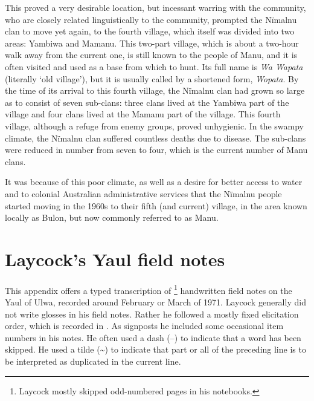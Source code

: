   This proved a very desirable location, but incessant warring with the  community, who are closely related linguistically to the  community, prompted the Nïmalnu clan to move yet again, to the fourth village, which itself was divided into two areas: Yambiwa and Mamanu. This two-part village, which is about a two-hour walk away from the current one, is still known to the people of Manu, and it is often visited and used as a base from which to hunt. Its full name is \textit{Wa Wapata} (literally ‘old village’), but it is usually called by a shortened form, \textit{Wopata}. By the time of its arrival to this fourth village, the Nïmalnu clan had grown so large as to consist of seven sub-clans: three clans lived at the \linebreak Yambiwa part of the village and four clans lived at the Mamanu part of the village. This fourth village, although a refuge from enemy groups, proved unhygienic. In the swampy climate, the Nïmalnu clan suffered countless deaths due to disease. The sub-clans were reduced in number from seven to four, which is the current number of Manu clans.

  It was because of this poor climate, as well as a desire for better access to water and to colonial Australian administrative services that the Nïmalnu people started moving in the 1960s to their fifth (and current) village, in the area known locally as Bulon, but now commonly referred to as Manu.

\chapter{Laycock’s Yaul field notes}\label{sec:app.g}


This appendix offers a typed transcription of \footnote{Laycock mostly skipped odd-numbered pages in his notebooks.} handwritten field notes on the Yaul  of Ulwa, recorded around February or March of 1971. Laycock generally did not write glosses in his field notes. Rather he followed a mostly fixed elicitation order, which is recorded in \citet[70--71]{Laycock1973}. As signposts he included some occasional item numbers in his notes. He often used a dash (--) to indicate that a word has been skipped. He used a tilde ({\textasciitilde}) to indicate that part or all of the preceding line is to be interpreted as duplicated in the current line.

